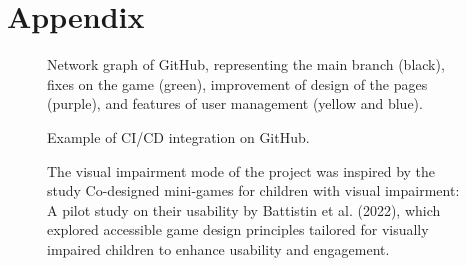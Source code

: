 
\chapter{Appendix}
\begin{appendices}

    \begin{figure}[H]
        \caption*{Network graph of GitHub, representing the main branch (black), fixes on the game (green), improvement of design of the pages (purple), and features of user management (yellow and blue).}
        \label{fig:network-grahp}
    \end{figure}
    
    \begin{figure}[H]
        \caption*{Example of CI/CD integration on GitHub.}
        \label{fig:ci-cd}
    \end{figure}
    
    \begin{figure}[H]
        \caption*{The visual impairment mode of the project was inspired by the study Co-designed mini-games for children with visual impairment: A pilot study on their usability by Battistin et al. (2022), which explored accessible game design principles tailored for visually impaired children to enhance usability and engagement.}
        \label{fig:impairment}
    \end{figure}
    
\end{appendices}